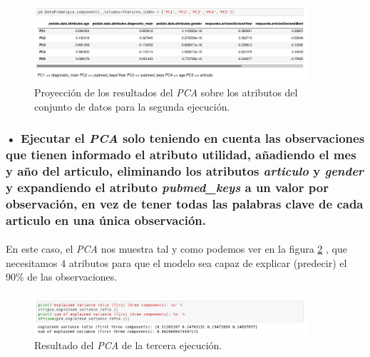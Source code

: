 \documentclass[10pt,a4paper,oneside]{book}
\begin{document}
\paragraph{}
\begin{figure}[!htb]
  \centering
    \includegraphics[width=0.9\textwidth]{images/metodologia_procesado_de_datos_pca2_atributos.png}
    \caption{Proyección de los resultados del \textit{PCA} sobre los atributos del conjunto de datos para la segunda ejecución.}
  \label{pcaTwoAtributos}
\end{figure}

\newpage
\subsubsection{• Ejecutar el \textit{PCA} solo teniendo en cuenta las observaciones que tienen informado el atributo utilidad, añadiendo el mes y año del articulo, eliminando los atributos \textit{articulo} y \textit{gender} y expandiendo el atributo \textit{pubmed\_keys} a un valor por observación, en vez de tener todas las palabras clave de cada articulo en una única observación.}

\paragraph{}
En este caso, el \textit{PCA} nos muestra tal y como podemos ver en la figura \ref{pcaThreeResult} , que necesitamos 4 atributos para que el modelo sea capaz de explicar (predecir) el 90\% de las observaciones.

\paragraph{}
\begin{figure}[!htb]
  \centering
    \includegraphics[width=0.9\textwidth]{images/metodologia_procesado_de_datos_pca3_result.png}
    \caption{Resultado del \textit{PCA} de la tercera ejecución.}
  \label{pcaThreeResult}
\end{figure}
\end{document}
